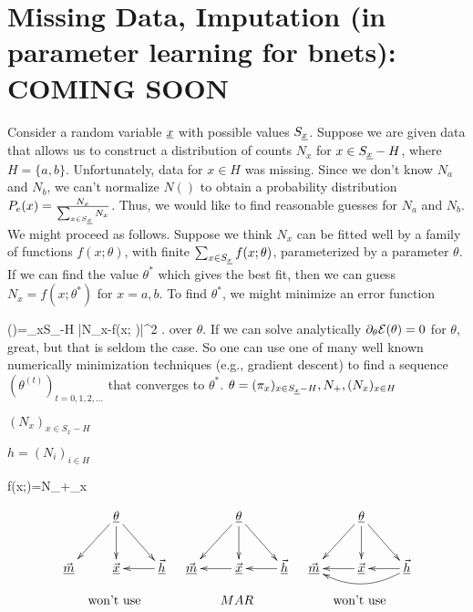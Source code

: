 \chapter{Missing Data, Imputation 
 (in parameter learning for bnets): COMING SOON}
\label{ch-missing-d}


Consider a random variable ${\underline{x}}$
with possible values $S_{\underline{x}}$.
Suppose we are given
data that allows us to construct
a distribution of counts
$N_x$
for $x\in S_{\underline{x}}-H$,
where $H=\{a,b\}$.
Unfortunately,
 data for $x\in H$
was missing.
Since we don't 
know $N_a$
and $N_b$,
we can't normalize
$N()$ to obtain
a probability distribution
$P_e(x)=\frac{N_x}
{\sum_{x\in S_{\underline{x}}}N_x}$.
Thus, we would
like to find 
reasonable guesses for $N_a$
and $N_b$.
We might proceed as follows.
Suppose we think
$N_x$ 
can be fitted well by
a family
of functions
$f(x;\theta)$,
with finite $\sum_{x\in S_{\underline{x}}}f(x;\theta)$,
parameterized by
a parameter $\theta$.
If we can find
the value $\theta^*$
which
gives the best fit,
then we can 
guess $N_x=f(x; \theta^*)$
for $x=a,b$.
To find $\theta^*$,
we might minimize
an error function

\beq
\cale(\theta)=\sum_{x\in S_\rvx-H}
|N_x-f(x; \theta)|^2
\;.
\eeq
over $\theta$.
If we can
solve analytically
$\partial_\theta {\cal E}(\theta)=0$
for $\theta$,
great, but that is seldom the case.
So one can use one
of many
well
known numerically
minimization
techniques (e.g., 
gradient descent)
to find 
a sequence
$(\theta^{(t)})_{t=0, 1, 2, \ldots}$
that converges to $\theta^*$.
$\theta= (\pi_x)_{x\in S_{\underline{x}}-H}, N_+, (N_x)_{x\in H}$

$(N_x)_{x\in S_x-H}$

$h=(N_i)_{i\in H}$

\beq
f(x;\theta)=N_+\pi_x
\eeq


\begin{figure}[h!]
$$
\begin{array}{ccc}
\xymatrix{
&\ul{\theta}\ar[d]\ar[ld]\ar[rd]
\\
\vec{\rvm}
&\vec{\rvx}
&\vec{\rvh}\ar[l]
}
&
\xymatrix{
&\ul{\theta}\ar[d]\ar[ld]\ar[rd]
\\
\vec{\rvm}
&\vec{\rvx}\ar[l]
&\vec{\rvh}\ar[l]
}
&
\xymatrix{
&\ul{\theta}\ar[d]\ar[ld]\ar[rd]
\\
\vec{\rvm}
&\vec{\rvx}\ar[l]
&\vec{\rvh}\ar[l]\ar@/^1pc/[ll]
}
\\
\\
\text{won't use}
&MAR
&\text{won't use}
\end{array}
$$
\end{figure}


